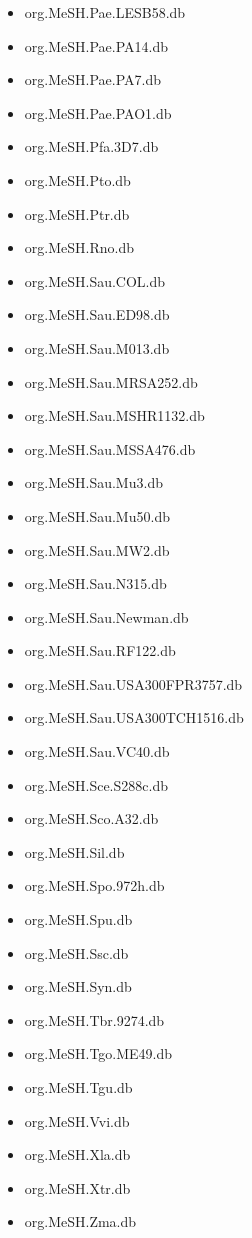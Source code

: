 \documentclass[margin,line,10pt]{res}
\newenvironment{list1}{
  \begin{list}{\ding{113}}{%
      \setlength{\itemsep}{0in}
      \setlength{\parsep}{0in} \setlength{\parskip}{0in}
      \setlength{\topsep}{0in} \setlength{\partopsep}{0in} 
      \setlength{\leftmargin}{0.17in}}}{\end{list}}
\begin{document}
\begin{resume}
\begin{list1}
\begin{multicols}{2}
\begin{itemize}
\item org.MeSH.Pae.LESB58.db 
\item org.MeSH.Pae.PA14.db
\item org.MeSH.Pae.PA7.db
\item org.MeSH.Pae.PAO1.db 
\item org.MeSH.Pfa.3D7.db
\item org.MeSH.Pto.db 
\item org.MeSH.Ptr.db 
\item org.MeSH.Rno.db  
\item org.MeSH.Sau.COL.db 
\item org.MeSH.Sau.ED98.db
\item org.MeSH.Sau.M013.db 
\item org.MeSH.Sau.MRSA252.db 
\item org.MeSH.Sau.MSHR1132.db
\item org.MeSH.Sau.MSSA476.db
\item org.MeSH.Sau.Mu3.db
\item org.MeSH.Sau.Mu50.db 
\item org.MeSH.Sau.MW2.db  
\item org.MeSH.Sau.N315.db 
\item org.MeSH.Sau.Newman.db 
\item org.MeSH.Sau.RF122.db 
\item org.MeSH.Sau.USA300FPR3757.db 
\item org.MeSH.Sau.USA300TCH1516.db 
\item org.MeSH.Sau.VC40.db
\item org.MeSH.Sce.S288c.db 
\item org.MeSH.Sco.A32.db 
\item org.MeSH.Sil.db 
\item org.MeSH.Spo.972h.db
\item org.MeSH.Spu.db
\item org.MeSH.Ssc.db 
\item org.MeSH.Syn.db 
\item org.MeSH.Tbr.9274.db 
\item org.MeSH.Tgo.ME49.db
\item org.MeSH.Tgu.db 
\item org.MeSH.Vvi.db 
\item org.MeSH.Xla.db  
\item org.MeSH.Xtr.db 
\item org.MeSH.Zma.db
\end{itemize}
\end{multicols}



\end{list1}
\end{resume}
\end{document}
